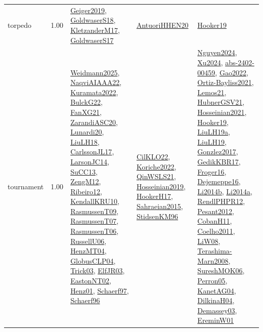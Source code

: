 {\begin{longtable}{p{3cm}r>{\raggedright\arraybackslash}p{6cm}>{\raggedright\arraybackslash}p{6cm}>{\raggedright\arraybackslash}p{8cm}}
\index{torpedo}\index{ApplicationAreas!torpedo}torpedo &  1.00 & \hyperref[detail:Geiger2019]{Geiger2019}, \hyperref[detail:GoldwaserS18]{GoldwaserS18}, \hyperref[detail:KletzanderM17]{KletzanderM17}, \hyperref[detail:GoldwaserS17]{GoldwaserS17} & \hyperref[detail:AntuoriHHEN20]{AntuoriHHEN20} & \hyperref[detail:Hooker19]{Hooker19}\\
\index{tournament}\index{ApplicationAreas!tournament}tournament &  1.00 & \hyperref[detail:Weidmann2025]{Weidmann2025}, \hyperref[detail:NaqviAIAAA22]{NaqviAIAAA22}, \hyperref[detail:Kuramata2022]{Kuramata2022}, \hyperref[detail:BulckG22]{BulckG22}, \hyperref[detail:FanXG21]{FanXG21}, \hyperref[detail:ZarandiASC20]{ZarandiASC20}, \hyperref[detail:Lunardi20]{Lunardi20}, \hyperref[detail:LiuLH18]{LiuLH18}, \hyperref[detail:CarlssonJL17]{CarlssonJL17}, \hyperref[detail:LarsonJC14]{LarsonJC14}, \hyperref[detail:SuCC13]{SuCC13}, \hyperref[detail:ZengM12]{ZengM12}, \hyperref[detail:Ribeiro12]{Ribeiro12}, \hyperref[detail:KendallKRU10]{KendallKRU10}, \hyperref[detail:RasmussenT09]{RasmussenT09}, \hyperref[detail:RasmussenT07]{RasmussenT07}, \hyperref[detail:RasmussenT06]{RasmussenT06}, \hyperref[detail:RussellU06]{RussellU06}, \hyperref[detail:HenzMT04]{HenzMT04}, \hyperref[detail:GlobusCLP04]{GlobusCLP04}, \hyperref[detail:Trick03]{Trick03}, \hyperref[detail:ElfJR03]{ElfJR03}, \hyperref[detail:EastonNT02]{EastonNT02}, \hyperref[detail:Henz01]{Henz01}, \hyperref[detail:Schaerf97]{Schaerf97}, \hyperref[detail:Schaerf96]{Schaerf96} & \hyperref[detail:CilKLO22]{CilKLO22}, \hyperref[detail:Koriche2022]{Koriche2022}, \hyperref[detail:QinWSLS21]{QinWSLS21}, \hyperref[detail:Hosseinian2019]{Hosseinian2019}, \hyperref[detail:HookerH17]{HookerH17}, \hyperref[detail:Sahraeian2015]{Sahraeian2015}, \hyperref[detail:StidsenKM96]{StidsenKM96} & \hyperref[detail:Nguyen2024]{Nguyen2024}, \hyperref[detail:Xu2024]{Xu2024}, \hyperref[detail:abs-2402-00459]{abs-2402-00459}, \hyperref[detail:Gao2022]{Gao2022}, \hyperref[detail:Ortiz-Bayliss2021]{Ortiz-Bayliss2021}, \hyperref[detail:Lemos21]{Lemos21}, \hyperref[detail:HubnerGSV21]{HubnerGSV21}, \hyperref[detail:Hosseinian2021]{Hosseinian2021}, \hyperref[detail:Hooker19]{Hooker19}, \hyperref[detail:LiuLH19a]{LiuLH19a}, \hyperref[detail:LiuLH19]{LiuLH19}, \hyperref[detail:Gonzlez2017]{Gonzlez2017}, \hyperref[detail:GedikKBR17]{GedikKBR17}, \hyperref[detail:Froger16]{Froger16}, \hyperref[detail:Dejemeppe16]{Dejemeppe16}, \hyperref[detail:Li2014b]{Li2014b}, \hyperref[detail:Li2014a]{Li2014a}, \hyperref[detail:RendlPHPR12]{RendlPHPR12}, \hyperref[detail:Pesant2012]{Pesant2012}, \hyperref[detail:CobanH11]{CobanH11}, \hyperref[detail:Coelho2011]{Coelho2011}, \hyperref[detail:LiW08]{LiW08}, \hyperref[detail:Terashima-Marn2008]{Terashima-Marn2008}, \hyperref[detail:SureshMOK06]{SureshMOK06}, \hyperref[detail:Perron05]{Perron05}, \hyperref[detail:KanetAG04]{KanetAG04}, \hyperref[detail:DilkinaH04]{DilkinaH04}, \hyperref[detail:Demassey03]{Demassey03}, \hyperref[detail:EreminW01]{EreminW01}\\

\end{longtable}}
